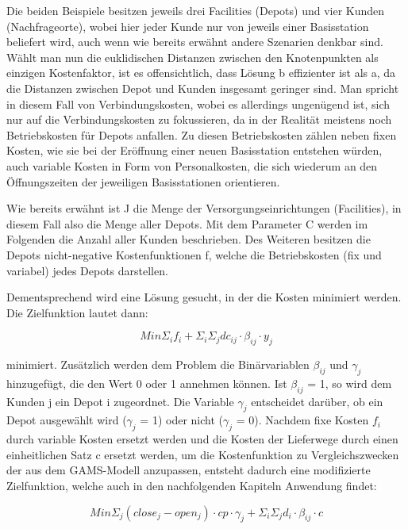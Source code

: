 \documentclass[a4paper,12pt,parskip,bibtotoc,liststotoc]{article}
\begin{document}
Die beiden Beispiele besitzen jeweils drei Facilities (Depots) und vier Kunden (Nachfrageorte), wobei hier jeder Kunde nur von jeweils einer Basisstation beliefert wird, auch wenn wie bereits erwähnt andere Szenarien denkbar sind.
Wählt man nun die euklidischen Distanzen zwischen den Knotenpunkten als einzigen Kostenfaktor, ist es offensichtlich, dass Lösung b effizienter ist als a, da die Distanzen zwischen Depot und Kunden insgesamt geringer sind. 
Man spricht in diesem Fall von Verbindungskosten, wobei es allerdings ungenügend ist, sich nur auf die Verbindungskosten zu fokussieren, da in der Realität meistens noch Betriebskosten für Depots anfallen.
Zu diesen Betriebskosten zählen neben fixen Kosten, wie sie bei der Eröffnung einer neuen Basisstation entstehen würden, auch variable Kosten in Form von Personalkosten, die sich wiederum an den Öffnungszeiten der jeweiligen Basisstationen orientieren.

Wie bereits erwähnt ist J die Menge der Versorgungseinrichtungen (Facilities), in diesem Fall also die Menge aller Depots. 
Mit dem Parameter C werden im Folgenden die Anzahl aller Kunden beschrieben. 
Des Weiteren besitzen die Depots nicht-negative Kostenfunktionen f, welche die Betriebskosten (fix und variabel) jedes Depots darstellen. 

Dementsprechend wird eine Lösung gesucht, in der die Kosten minimiert werden.\\

Die Zielfunktion lautet dann:

\begin{equation}
Min \Sigma_{i} f_{i}  + \Sigma_{i} \Sigma_{j} dc_{ij} \cdot \beta_{ij} \cdot y_{j}
\end{equation}
 
minimiert.
Zusätzlich werden dem Problem die Binärvariablen $\beta_{ij}$ und $\gamma_{j}$ hinzugefügt, die den Wert 0 oder 1 annehmen können. Ist $\beta_{ij}$ = 1, so wird dem Kunden j ein Depot i zugeordnet. 
Die Variable  $\gamma_{j}$ entscheidet darüber, ob ein Depot ausgewählt wird ($\gamma_{j}$ = 1) oder nicht ($\gamma_{j}$ = 0). 
Nachdem fixe Kosten $f_{i}$ durch variable Kosten ersetzt werden und die Kosten der Lieferwege durch einen einheitlichen Satz c ersetzt werden, um die Kostenfunktion zu Vergleichszwecken der aus dem GAMS-Modell anzupassen, entsteht dadurch eine modifizierte Zielfunktion, welche auch in den nachfolgenden Kapiteln Anwendung findet:


\begin{equation} \label{obj}
Min \Sigma_{j} (close_{j}-open_{j})\cdot cp \cdot \gamma_{j}  + \Sigma_{i}\Sigma_{j} d_{i} \cdot \beta_{ij} \cdot c
\end{equation}\\
\end{document}
